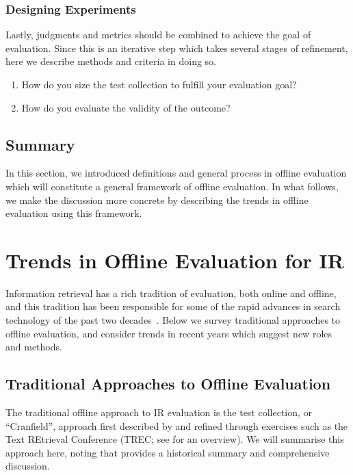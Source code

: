 \subsubsection{Designing Experiments}
Lastly, judgments and metrics should be combined to achieve the goal of evaluation. Since this is an iterative step which takes several stages of refinement, here we describe methods and criteria in doing so. 


\begin{enumerate}
	\item How do you size the test collection to fulfill your evaluation goal?
	\item How do you evaluate the validity of the outcome?
\end{enumerate}

\subsection{Summary}
In this section, we introduced definitions and general process in offline evaluation which will constitute a general framework of offline evaluation. In what follows, we make the discussion more concrete by describing the trends in offline evaluation using this framework.

\section{Trends in Offline Evaluation for IR}

Information retrieval has a rich tradition of evaluation, both online and offline, and this tradition has been responsible for some of the rapid advances in search technology of the past two decades~\citep{TRECimpact}. Below we survey traditional approaches to offline evaluation, and consider trends in recent years which suggest new roles and methods.

\subsection{Traditional Approaches to Offline Evaluation}

The traditional offline approach to IR evaluation is the test collection, or ``Cranfield'', approach first described by \cite{cleverdon67} and refined through exercises such as the Text REtrieval Conference (TREC; see \cite{voor:trec05} for an overview).  We will summarise this approach here, noting that \cite{INR-009} provides a historical summary and comprehensive discussion.

